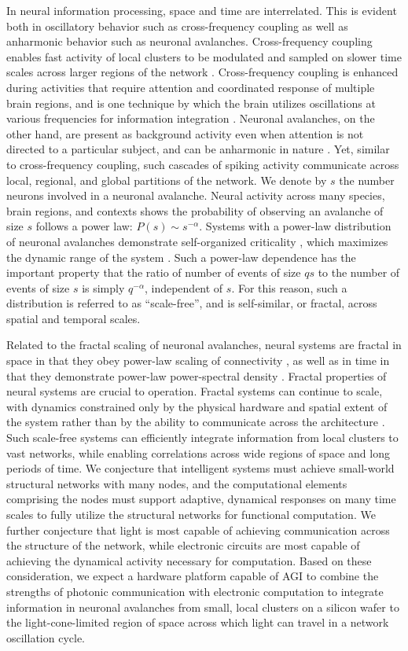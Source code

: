 \documentclass[twocolumn]{article}
\begin{document}
In neural information processing, space and time are interrelated. This is evident both in oscillatory behavior such as cross-frequency coupling as well as anharmonic behavior such as neuronal avalanches. Cross-frequency coupling enables fast activity of local clusters to be modulated and sampled on slower time scales across larger regions of the network \cite{stsa2000,heze2010}. Cross-frequency coupling is enhanced during activities that require attention and coordinated response of multiple brain regions, and is one technique by which the brain utilizes oscillations at various frequencies for information integration \cite{bu2006}. Neuronal avalanches, on the other hand, are present as background activity even when attention is not directed to a particular subject, and can be anharmonic in nature \cite{heze2010}. Yet, similar to cross-frequency coupling, such cascades of spiking activity communicate across local, regional, and global partitions of the network. We denote by $s$ the number neurons involved in a neuronal avalanche. Neural activity across many species, brain regions, and contexts shows the probability of observing an avalanche of size $s$ follows a power law: $P(s)\sim s^{-\alpha}$. Systems with a power-law distribution of neuronal avalanches demonstrate self-organized criticality \cite{plth2006}, which maximizes the dynamic range of the system \cite{kico2006,be2007}. Such a power-law dependence has the important property that the ratio of number of events of size $qs$ to the number of events of size $s$ is simply $q^{-\alpha}$, independent of $s$. For this reason, such a distribution is referred to as ``scale-free'', and is self-similar, or fractal, across spatial and temporal scales. 

Related to the fractal scaling of neuronal avalanches, neural systems are fractal in space in that they obey power-law scaling of connectivity \cite{bagr2010}, as well as in time in that they demonstrate power-law power-spectral density \cite{budr2004}. Fractal properties of neural systems are crucial to operation. Fractal systems can continue to scale, with dynamics constrained only by the physical hardware and spatial extent of the system rather than by the ability to communicate across the architecture \cite{plth2007}. Such scale-free systems can efficiently integrate information from local clusters to vast networks, while enabling correlations across wide regions of space and long periods of time. We conjecture that intelligent systems must achieve small-world structural networks with many nodes, and the computational elements comprising the nodes must support adaptive, dynamical responses on many time scales to fully utilize the structural networks for functional computation. We further conjecture that light is most capable of achieving communication across the structure of the network, while electronic circuits are most capable of achieving the dynamical activity necessary for computation. Based on these consideration, we expect a hardware platform capable of AGI to combine the strengths of photonic communication with electronic computation to integrate information in neuronal avalanches from small, local clusters on a silicon wafer to the light-cone-limited region of space across which light can travel in a network oscillation cycle.  
\end{document}
